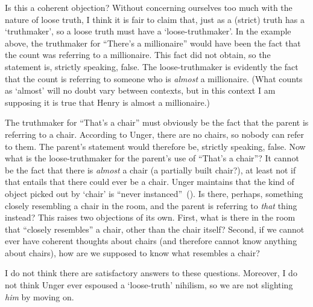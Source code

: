 \documentclass[11pt]{article}
\newcommand{\stage}[3]%
{%
	\begin{spacing}{1}%
	\vspace{0pt}
		\begin{description}[style=nextline, parsep=0pt, leftmargin=15mm, itemindent=-10mm, font=\mdseries]
			\item[\textsc{#1} \emph{#2}] #3
		\end{description}%
	\end{spacing}%
}
\begin{document}
\begin{spacing}{1.5}
Is this a coherent objection? Without concerning ourselves too much with the nature of loose truth, I think it is fair to claim that, just as a (strict) truth has a `truthmaker', so a loose truth must have a `loose-truthmaker'. In the example above, the truthmaker for ``There's a millionaire'' would have been the fact that the count was referring to a millionaire. This fact did not obtain, so the statement is, strictly speaking, false. The loose-truthmaker is evidently the fact that the count is referring to someone who is {\em almost} a millionaire. (What counts as `almost' will no doubt vary between contexts, but in this context I am supposing it is true that Henry is almost a millionaire.)

The truthmaker for ``That's a chair'' must obviously be the fact that the parent is referring to a chair. According to Unger, there are no chairs, so nobody can refer to them. The parent's statement would therefore be, strictly speaking, false. Now what is the loose-truthmaker for the parent's use of ``That's a chair''? It cannot be the fact that there is {\em almost} a chair (a partially built chair?), at least not if that entails that there could ever be a chair. Unger maintains that the kind of object picked out by `chair' is ``never instanced''~(\citeyear[147]{unger1979}). Is there, perhaps, something closely resembling a chair in the room, and the parent is referring to {\em that} thing instead? This raises two objections of its own. First, what is there in the room that ``closely resembles'' a chair, other than the chair itself? Second, if we cannot ever have coherent thoughts about chairs (and therefore cannot know anything about chairs), how are we supposed to know what resembles a chair?

I do not think there are satisfactory answers to these questions. Moreover, I do not think Unger ever espoused a `loose-truth' nihilism, so we are not slighting {\em him} by moving on.

%


\end{spacing}
\end{document}
